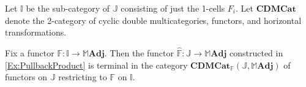 
Let $\mathbb{I}$ be the sub-category of $\mathbb{J}$ consisting of just the 1-cells $F_i$. Let $\mathbf{CDMCat}$ denote the 2-category of cyclic double multicategories, functors, and horizontal transformations.

\begin{theorem}\label{Thm:MAdjArrowObjects}
	Fix a functor $\mathbb{F}\colon\mathbb{I}\to\mathbb{M}\mathbf{Adj}$. Then the functor $\hat{\mathbb{F}}\colon\mathbb{J}\to\mathbb{M}\mathbf{Adj}$ constructed in \cref{Ex:PullbackProduct} is terminal in the category $\mathbf{CDMCat}_{\mathbb{F}}(\mathbb{J},\mathbb{M}\mathbf{Adj})$ of functors on $\mathbb{J}$ restricting to $\mathbb{F}$ on $\mathbb{I}$.
\end{theorem}
